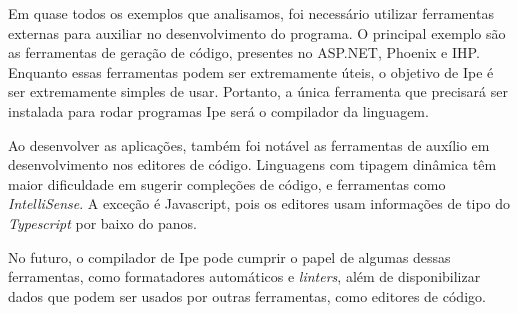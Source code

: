 Em quase todos os exemplos que analisamos, foi necessário utilizar ferramentas
externas para auxiliar no desenvolvimento do programa. O principal exemplo são
as ferramentas de geração de código, presentes no ASP.NET, Phoenix e IHP. Enquanto
essas ferramentas podem ser extremamente úteis, o objetivo de Ipe é ser extremamente
simples de usar. Portanto, a única ferramenta que precisará ser instalada para
rodar programas Ipe será o compilador da linguagem.

Ao desenvolver as aplicações, também foi notável as ferramentas de auxílio em
desenvolvimento nos editores de código. Linguagens com tipagem dinâmica têm maior
dificuldade em sugerir compleções de código, e ferramentas como \textit{IntelliSense}.
A exceção é Javascript, pois os editores usam informações de tipo do \textit{Typescript}
por baixo do panos.

No futuro, o compilador de Ipe pode cumprir o papel de algumas dessas ferramentas,
como formatadores automáticos e \textit{linters}, além de disponibilizar dados
que podem ser usados por outras ferramentas, como editores de código.
